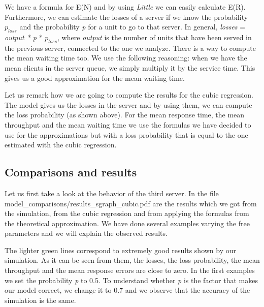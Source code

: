 \documentclass[12pt]{article}
\theoremstyle{plain}
\begin{document}
We have a formula for E(N) and by using \emph{Little} we can easily calculate
E(R). Furthermore, we can estimate the losses of a server if we know the
probability $p_{loss}$ and the probability \emph{p} for a unit to go to that
server. In general, \emph{losses} = \emph{output * p} * $p_{loss}$, where
\emph{output} is the number of units that have been served in the previous
server, connected to the one we analyze. There is a way to compute the mean
waiting time too. We use the following reasoning: when we have the mean clients
in the server queue, we simply multiply it by the service time. This gives us a
good approximation for the mean waiting time.

Let us remark how we are going to compute the results for the cubic regression.
The model gives us the losses in the server and by using them, we can compute
the loss probability (as shown above). For the mean response time, the mean
throughput and the mean waiting time we use the formulas we have decided to use
for the approximations but with a loss probability that is equal to the one
estimated with the cubic regression.

\subsection*{Comparisons and results}

Let us first take a look at the behavior of the third server. In the file
\linebreak model\_comparisons/results\_sgraph\_cubic.pdf are the results which we got from the
simulation, from the cubic regression and from applying the formulas from the
theoretical approximation. We have done several examples varying the free
parameters and we will explain the observed results.  

The lighter green lines correspond to extremely good results shown by our
simulation. As it can be seen from them, the losses, the loss probability, the
mean throughput and the mean response errors are close to zero. In the first
examples we set the probability \emph{p} to 0.5. To understand whether \emph{p}
is the factor that makes our model correct, we change it to 0.7 and we observe
that the accuracy of the simulation is the same.
\end{document}
